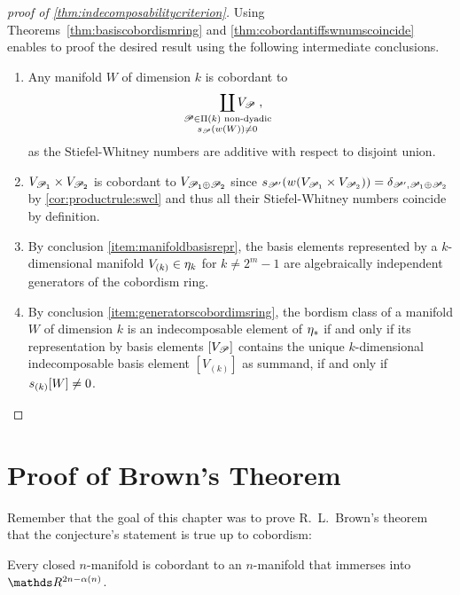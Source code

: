 \begin{proof}[proof of \autoref{thm:indecomposabilitycriterion}]
  Using Theorems~\autoref{thm:basiscobordismring} and
  \autoref{thm:cobordantiffswnumscoincide} enables to proof the
  desired result using the following intermediate conclusions.
  \begin{enumerate}
  \item Any manifold $W$ of dimension $k$ is
    cobordant to
    \begin{gather*}
      \coprod_{\mathclap{\substack{
            \Part\in\PartitionsOf k \text{ non-dyadic}\\
            \s{\Part}(\W{W})\neq 0
          }}} V_\Part
      \;,
    \end{gather*}
    as the Stiefel-Whitney numbers are additive with respect to
    disjoint union. %
  \item\label{item:manifoldbasisrepr}
    $V_{\mathscr{P}_1}\times V_{\mathscr{P}_2}$ is cobordant to
    $V_{\mathscr{P}_1\oplus\mathscr{P}_2}$ since
    $s_{\mathscr{P}'}({w}(V_{\mathscr{P}_1}\times V_{\mathscr{P}_2}))
    = \delta_{\mathscr{P}', \mathscr{P}_1\oplus\mathscr{P}_2}$
    by \ref{cor:productrule:swcl} and thus all their Stiefel-Whitney
    numbers coincide by definition.
  \item\label{item:generatorscobordimsring}
    By conclusion \ref{item:manifoldbasisrepr},
    the basis elements represented by a $k$-dimensional manifold
    $V_{(k)}\in\eta_k$ for $k\neq 2^m-1$ are algebraically independent
    generators of the cobordism ring.
  \item By conclusion \ref{item:generatorscobordimsring}, the bordism
    class of a manifold $W$ of dimension $k$ is an indecomposable
    element of $\eta_*$ if and only if its representation by basis
    elements $[V_{\mathscr{P}}]$ contains the unique $k$-dimensional
    indecomposable basis element $[V_{(k)}]$ as summand,
    \idest if and only if $s_{(k)}[W]\neq 0$.
    \qedhere
  \end{enumerate}
\end{proof}

\section{Proof of Brown's Theorem}
Remember that the goal of this chapter was to prove R.~L.~Brown's
theorem that the conjecture's statement is true up to cobordism:
\begin{Thm}[Brown]\label{thm:brown}
  Every closed $n$-manifold is cobordant to an $n$-manifold that immerses
  into $\R^{2n-\alpha(n)}$.
\end{Thm}

